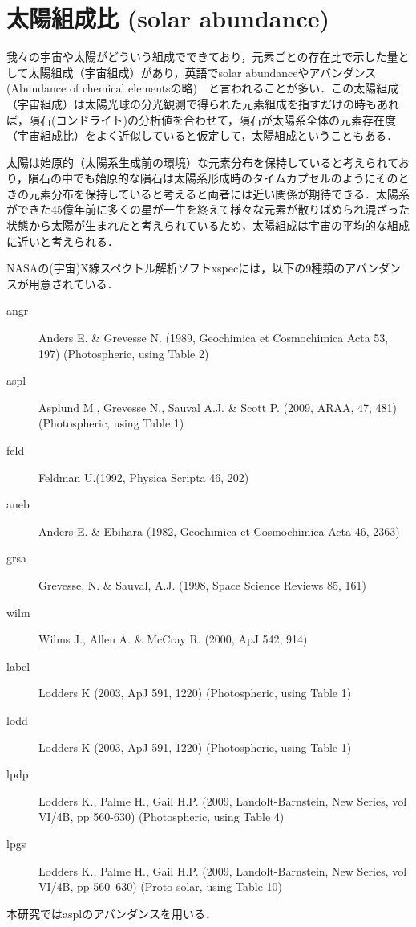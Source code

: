\section{太陽組成比 (solar abundance)}

我々の宇宙や太陽がどういう組成でできており，元素ごとの存在比で示した量として太陽組成（宇宙組成）があり，英語でsolar abundanceやアバンダンス (Abundance of chemical elementsの略)　と言われることが多い．この太陽組成（宇宙組成）は太陽光球の分光観測で得られた元素組成を指すだけの時もあれば，隕石(コンドライト)の分析値を合わせて，隕石が太陽系全体の元素存在度（宇宙組成比）をよく近似していると仮定して，太陽組成ということもある．

太陽は始原的（太陽系生成前の環境）な元素分布を保持していると考えられており，隕石の中でも始原的な隕石は太陽系形成時のタイムカプセルのようにそのときの元素分布を保持していると考えると両者には近い関係が期待できる．太陽系ができた45億年前に多くの星が一生を終えて様々な元素が散りばめられ混ざった状態から太陽が生まれたと考えられているため，太陽組成は宇宙の平均的な組成に近いと考えられる．

NASAの(宇宙)X線スペクトル解析ソフトxspecには，以下の9種類のアバンダンスが用意されている．
\begin{description}
	\item[angr] Anders E. \& Grevesse N. (1989, Geochimica et Cosmochimica Acta 53, 197) (Photospheric, using Table 2)
	\item[aspl] Asplund M., Grevesse N., Sauval A.J. \& Scott P. (2009, ARAA, 47, 481) (Photospheric, using Table 1)
	\item[feld] Feldman U.(1992, Physica Scripta 46, 202)
	\item[aneb] Anders E. \& Ebihara (1982, Geochimica et Cosmochimica Acta 46, 2363)
	\item[grsa] Grevesse, N. \& Sauval, A.J. (1998, Space Science Reviews 85, 161)
	\item[wilm] Wilms J., Allen A. \& McCray R. (2000, ApJ 542, 914)
	\item[label] Lodders K (2003, ApJ 591, 1220) (Photospheric, using Table 1)
	\item[lodd] Lodders K (2003, ApJ 591, 1220) (Photospheric, using Table 1)
	\item[lpdp] Lodders K., Palme H., Gail H.P. (2009, Landolt-Barnstein, New Series, vol VI/4B, pp 560-630) (Photospheric, using Table 4)
	\item[lpgs] Lodders K., Palme H., Gail H.P. (2009, Landolt-Barnstein, New Series, vol VI/4B, pp 560--630) (Proto-solar, using Table 10)
\end{description}

本研究ではasplのアバンダンスを用いる．